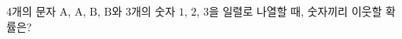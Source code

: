 4개의 문자 $\mathrm{A}$, $\mathrm{A}$, $\mathrm{B}$, $\mathrm{B}$와 3개의 숫자 $1$, $2$, $3$을 일렬로 나열할 때, 숫자끼리 이웃할 확률은?
